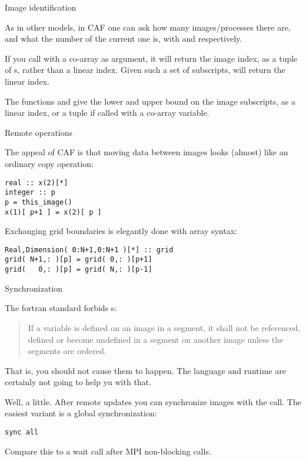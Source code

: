  {Image identification}

As in other models, in \ac{CAF} one can ask how many images/processes there are,
and what the number of the current one is,
with  and  respectively.


If you call  with a co-array as argument,
it will return the image index, as a tuple of s,
rather than a linear index.
Given such a set of subscripts, 
will return the linear index.

The functions  and 
give the lower and upper bound on the image subscripts,
as a linear index, or a tuple if called with a co-array variable.

 {Remote operations}

The appeal of \ac{CAF} is that moving data between images
looks (almost) like an ordinary copy operation:
\begin{lstlisting}
real :: x(2)[*]
integer :: p
p = this_image()
x(1)[ p+1 ] = x(2)[ p ]
\end{lstlisting}

Exchanging grid boundaries is elegantly done with array syntax:
\begin{lstlisting}
Real,Dimension( 0:N+1,0:N+1 )[*] :: grid
grid( N+1,: )[p] = grid( 0,: )[p+1]
grid(   0,: )[p] = grid( N,: )[p-1]
\end{lstlisting}

 {Synchronization}

The fortran standard forbids s:
\begin{quote}
  If a variable is defined on an image in a segment, it shall not be
  referenced, defined or become undefined in a segment on another
  image unless the segments are ordered.
\end{quote}
That is, you should not cause them to happen. The language and runtime
are certainly not going to help yu with that.

Well, a little. After remote updates you can synchronize images
with the  call.
The easiest variant is a global synchronization:
\begin{lstlisting}
sync all
\end{lstlisting}
Compare this to a wait call after MPI non-blocking calls.

